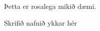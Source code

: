 \documentclass[10pt,a5paper,english]{book}
\begin{document}
Þetta er rosalega mikið dæmi.

Skrifið nafnið ykkar hér  
\end{document}
